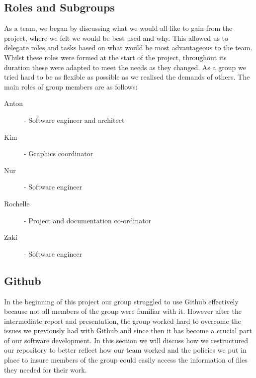 \documentclass{article}
\begin{document}
 
	\subsection{Roles and Subgroups}
	
	As a team, we began by discussing what we would all like to gain from the project, where we felt we would be best used and why. 
	This allowed us to delegate roles and tasks based on what would be most advantageous to the team. 
	Whilst these roles were formed at the start of the project, throughout its duration these were adapted to meet the needs as they changed. 
	As a group we tried hard to be as flexible as possible as we realised the demands of others.
	The main roles of group members are as follows:
	
	\begin{description}
		\item [Anton] - Software engineer and architect
		\item [Kim] - Graphics coordinator
		\item [Nur] - Software engineer
		\item [Rochelle] - Project and documentation co-ordinator
		\item [Zaki] - Software engineer
	\end{description}
	
	
	\subsection{Github}
	
	In the beginning of this project our group struggled to use Github effectively because not all members of the group were familiar with it. However after the intermediate report and presentation, the group worked hard to overcome the issues we previously had with Github and since then it has become a crucial part of our software development. In this section we will discuss how we restructured our repository to better reflect how our team worked and the policies we put in place to insure members of the group could easily access the information of files they needed for their work. 
	
\end{document}
